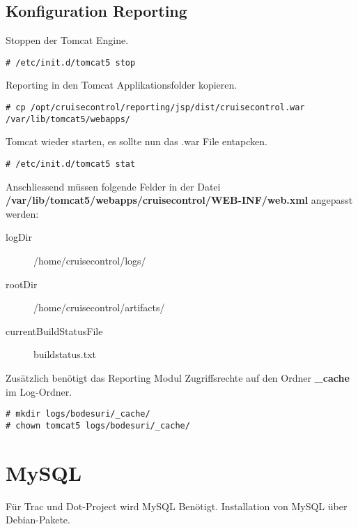 \documentclass[a4paper,12pt,halfparskip,DIV14]{scrreprt}
\begin{document}

\subsection{Konfiguration Reporting} %
\label{sub:konfiguration_reporting}

Stoppen der Tomcat Engine.

\begin{verbatim}
# /etc/init.d/tomcat5 stop
\end{verbatim}

Reporting in den Tomcat Applikationsfolder kopieren.

\begin{verbatim}
# cp /opt/cruisecontrol/reporting/jsp/dist/cruisecontrol.war /var/lib/tomcat5/webapps/
\end{verbatim}

Tomcat wieder starten, es sollte nun das .war File entapcken.

\begin{verbatim}
# /etc/init.d/tomcat5 stat
\end{verbatim}

Anschliessend müssen folgende Felder in der Datei \textbf{/var/lib/tomcat5/webapps/cruisecontrol/WEB-INF/web.xml} angepasst werden:

\begin{description}
  \item[logDir] /home/cruisecontrol/logs/
  \item[rootDir] /home/cruisecontrol/artifacts/
  \item[currentBuildStatusFile] buildstatus.txt
\end{description}

Zusätzlich benötigt das Reporting Modul Zugriffsrechte auf den Ordner \textbf{\_cache} im Log-Ordner.

\begin{verbatim}
# mkdir logs/bodesuri/_cache/
# chown tomcat5 logs/bodesuri/_cache/
\end{verbatim}



\section{MySQL} %
\label{sec:mysql}

Für Trac und Dot-Project wird MySQL Benötigt. Installation von MySQL über Debian-Pakete.
\end{document}
